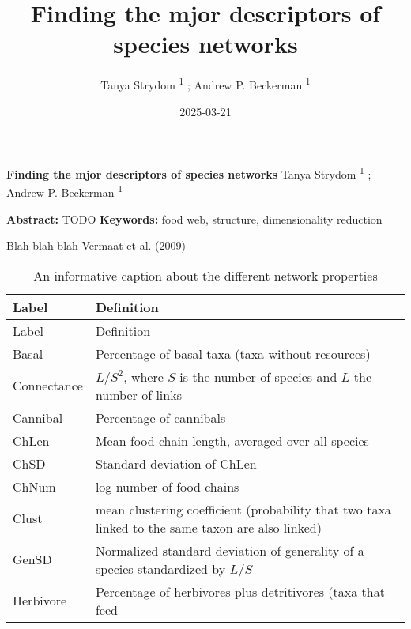 \documentclass[
]{article}
\title{Finding the mjor descriptors of species networks}
\author{Tanya Strydom %
%
\textsuperscript{%
%
1%
}%
; Andrew P. Beckerman %
%
\textsuperscript{%
%
1%
}%
}
\date{2025-03-21}
\begin{document}
\thispagestyle{empty}
{\bfseries\sffamily\Large Finding the mjor descriptors of species
networks}
\vfil
Tanya Strydom %
%
\textsuperscript{%
%
1%
}%
; Andrew P. Beckerman %
%
\textsuperscript{%
%
1%
}%

\vfil
{\small
\textbf{Abstract:} TODO
\vfil
\textbf{Keywords:} %
food web, structure, %
dimensionality reduction%
}
\clearpage
\setcounter{page}{1}
\doublespacing
\linenumbers


Blah blah blah Vermaat et al. (2009)

\begin{longtable}[]{@{}
  >{\raggedright\arraybackslash}p{}
  >{\raggedright\arraybackslash}p{}@{}}
\caption{An informative caption about the different network
properties}\label{tbl-properties}\tabularnewline
\toprule\noalign{}
\begin{minipage}[b]{\linewidth}\raggedright
Label
\end{minipage} & \begin{minipage}[b]{\linewidth}\raggedright
Definition
\end{minipage} \\
\midrule\noalign{}
\endfirsthead
\toprule\noalign{}
\begin{minipage}[b]{\linewidth}\raggedright
Label
\end{minipage} & \begin{minipage}[b]{\linewidth}\raggedright
Definition
\end{minipage} \\
\midrule\noalign{}
\endhead
\bottomrule\noalign{}
\endlastfoot
Basal & Percentage of basal taxa (taxa without resources) \\
Connectance & \(L/S^2\), where \(S\) is the number of species and \(L\)
the number of links \\
Cannibal & Percentage of cannibals \\
ChLen & Mean food chain length, averaged over all species \\
ChSD & Standard deviation of ChLen \\
ChNum & log number of food chains \\
Clust & mean clustering coefficient (probability that two taxa linked to
the same taxon are also linked) \\
GenSD & Normalized standard deviation of generality of a species
standardized by \(L/S\) \\
Herbivore & Percentage of herbivores plus detritivores (taxa that feed

\end{longtable}
\end{document}
